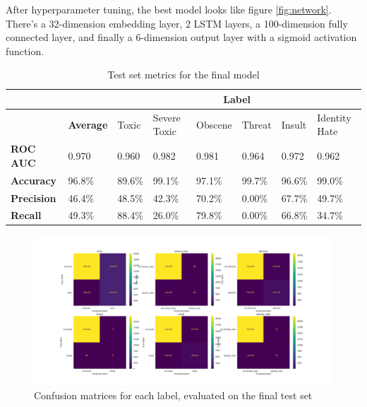 \documentclass[12pt]{article}
\begin{document}
After hyperparameter tuning, the best model looks like figure \ref{fig:network}. There's a 32-dimension embedding layer, 2 LSTM layers, a 100-dimension fully connected layer, and finally a 6-dimension output layer with a sigmoid activation function.

\begin{center}
\begin{table}
\begin{tabular}{| m{5em} | m{1.5cm} | m{1.5cm} | m{1.5cm} | m{1.5cm} | m{1.5cm} | m{1.5cm} | m{1.5cm} |}
\hline
\multicolumn{2}{|c}{} & \multicolumn{6}{c|}{Label} \\
\hline
& \textbf{Average} & Toxic & Severe Toxic & Obscene & Threat & Insult & Identity Hate \\
\hline
\textbf{ROC AUC} & 0.970 & 0.960 & 0.982 & 0.981 & 0.964 & 0.972 & 0.962 \\
\hline
\textbf{Accuracy} & 96.8\% & 89.6\% & 99.1\% & 97.1\% & 99.7\% & 96.6\% & 99.0\% \\
\hline
\textbf{Precision} & 46.4\% & 48.5\% & 42.3\% & 70.2\% & 0.00\% & 67.7\% & 49.7\% \\
\hline
\textbf{Recall} & 49.3\% & 88.4\% & 26.0\% & 79.8\% & 0.00\% & 66.8\% & 34.7\% \\
\hline
\end{tabular}
\caption{Test set metrics for the final model}
\label{table:3}
\end{table}
\end{center}

\begin{figure}
\centering
\includegraphics[width=\textwidth]{confusion_matrix}
\caption{Confusion matrices for each label, evaluated on the final test set}
\label{fig:confusion-matrix}
\end{figure}
\end{document}
